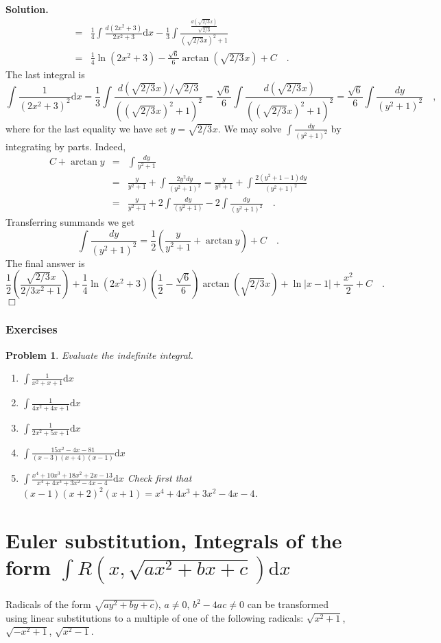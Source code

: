 \documentclass[12pt]{book}
\newcommand{\diff}{\text{d}}
\newenvironment{solution}{\textbf{Solution.} }{$\Box$}
\newtheorem{problem}{Problem}[section]
\begin{document}
\begin{solution}
\[\begin{array}{rcl}
&=&\frac{1}{4} \int \frac{d(2x^2+3)}{2x^2+3}\diff x- \frac{1}{3}\int \frac{\frac{d (\sqrt{2/3}x)} {\sqrt{2/3}}} {\left( \sqrt{2/3}x\right)^2+1} \\
&=&\frac{1}{4}\ln (2x^2+3)-\frac{\sqrt{6}}{6}\arctan (\sqrt{2/3}x)+C
\quad .
\end{array}
\]
The last integral is
\[
\int \frac{1}{(2x^2+3)^2}\diff x= \frac{1}3 \int \frac{d(\sqrt{2/3}x)/\sqrt{2/3}}{((\sqrt{2/3}x)^2+1)^2}= \frac{\sqrt{6}}{6}\int \frac{d(\sqrt{2/3}x)}{((\sqrt{2/3}x)^2+1)^2}= \frac{\sqrt{6}}{6}\int \frac{dy}{(y^2+1)^2}\quad,
\]
where for the last equality we have set $y=\sqrt{2/3}x$. We may solve $\displaystyle\int\frac{dy}{(y^2+1)^2}$ by integrating by parts. Indeed,
\[\begin{array}{rcl}
C+\arctan y &=&\displaystyle \int \frac{dy}{y^2+1}\\
&=&\displaystyle \frac{y}{y^2+1} +\int \frac{2y^2dy}{(y^2+1)^2}= \frac{y}{y^2+1}+\int \frac{2(y^2+1-1)dy}{(y^2+1)^2}\\
&=&\displaystyle \frac{y}{y^2+1} + 2\int \frac{dy}{(y^2+1)}- 2\int \frac{dy}{(y^2+1)^2}\quad.
\end{array}
\]
Transferring summands we get 
\[
\int \frac{dy}{(y^2+1)^2}= \frac{1}{2}\left(\frac{y}{y^2+1}+\arctan y\right) +C\quad .
\]
The final answer is 
\[
\frac{1}{2}\left(\frac{\sqrt{2/3}x}{2/3x^2+1}\right) +\frac{1}{4}\ln (2x^2+3)\left(\frac{1}2-\frac{\sqrt{6}}{6}\right)\arctan (\sqrt{2/3}x)+\ln|x-1|+\frac{x ^2}2+C\quad .
\]
\end{solution}
\subsubsection{Exercises}
\begin{problem}
Evaluate the indefinite integral. 
\begin{enumerate}
\item $\int \frac1{x^2+x+1}\diff x$
\item $\int \frac1{4x^2+4x+1}\diff x$
\item $\int \frac1{2x^2+5x+1}\diff x$
\item $\int \frac{15x^2-4x-81}{(x-3)(x+4)(x-1)}\diff x$
\item $\int \frac {x^{4}+10x^{3}+18x^{2}+2x-13}{x^{4}+4x^{3}+3x^{2}-4x-4}\diff x$ 
Check first that $(x-1)(x+2)^2(x+1)= x^{4}+4x^{3}+3x^{2}-4x-4$.
\end{enumerate}
\end{problem}
\section{Euler substitution, Integrals of the form $\int R(x, \sqrt{ax^2+bx+c})\diff x$}
Radicals of the form  $\sqrt{ay^2+by+c})$, $a\neq 0$, $b^2-4ac\neq 0$ can be transformed using linear substitutions to a multiple of one of the following radicals: $\sqrt{x^2+1}$, $\sqrt{-x^2+1}$,  $\sqrt{x^2-1}$.
\end{document}
